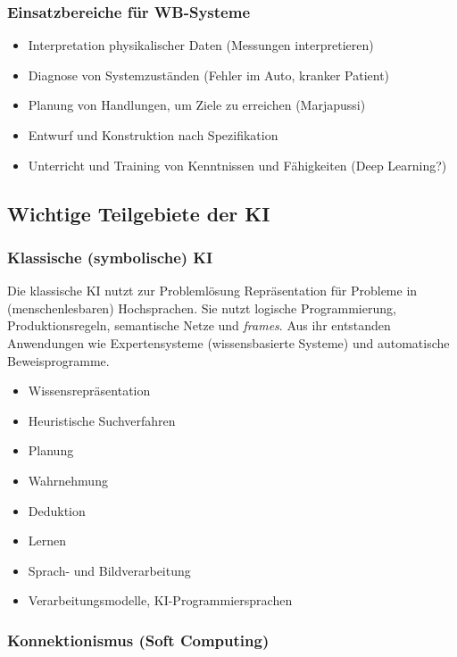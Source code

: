 \documentclass[runningheads]{llncs}
\begin{document}
\subsubsection{Einsatzbereiche für WB-Systeme}
\begin{itemize}
    \item Interpretation physikalischer Daten (Messungen interpretieren)
    \item Diagnose von Systemzuständen (Fehler im Auto, kranker Patient)
    \item Planung von Handlungen, um Ziele zu erreichen (Marjapussi)
    \item Entwurf und Konstruktion nach Spezifikation 
    \item Unterricht und Training von Kenntnissen und Fähigkeiten (Deep Learning?)
\end{itemize}

\subsection{Wichtige Teilgebiete der KI}

\subsubsection{Klassische (symbolische) KI}

Die klassische KI nutzt zur Problemlösung Repräsentation für Probleme in (menschenlesbaren) Hochsprachen. Sie nutzt logische Programmierung, Produktionsregeln, semantische Netze und \textit{frames}. Aus ihr entstanden Anwendungen wie Expertensysteme (wissensbasierte Systeme) und automatische Beweisprogramme.

\begin{itemize}
    \item Wissensrepräsentation
    \item Heuristische Suchverfahren
    \item Planung
    \item Wahrnehmung
    \item Deduktion
    \item Lernen
    \item Sprach- und Bildverarbeitung
    \item Verarbeitungsmodelle, KI-Programmiersprachen
\end{itemize}

\subsubsection{Konnektionismus (Soft Computing)}
\end{document}
